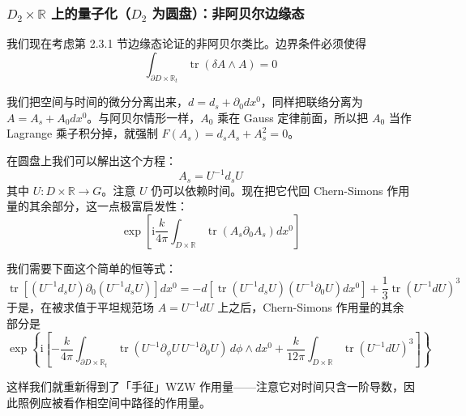 \subsubsection{\texorpdfstring{$D_2\times\mathbb{R}$}{D2xR} 上的量子化（$D_2$ 为圆盘）：非阿贝尔边缘态} %

我们现在考虑第 2.3.1 节边缘态论证的非阿贝尔类比。边界条件必须使得
\begin{equation}
  \int_{\partial D\times\mathbb{R}_t}\operatorname{tr}(\delta A\wedge A)=0
  \tag{3.82}
  \label{eq:3.82}
\end{equation}

我们把空间与时间的微分分离出来，$d=d_s+\partial_0dx^0$，同样把联络分离为 $A=A_s+A_0dx^0$。与阿贝尔情形一样，$A_0$ 乘在 Gauss 定律前面，所以把 $A_0$ 当作 Lagrange 乘子积分掉，就强制 $F(A_s)=d_sA_s+A_s^2=0$。

在圆盘上我们可以解出这个方程：
\begin{equation}
  A_s=U^{-1}d_sU
  \tag{3.83}
  \label{eq:3.83}
\end{equation}
其中 $U:D\times\mathbb{R}\to G$。注意 $U$ 仍可以依赖时间。现在把它代回 Chern-Simons 作用量的其余部分，这一点极富启发性：
\begin{equation}
  \exp\left[\mathrm{i}\frac{k}{4\pi}\int_{D\times\mathbb{R}}\operatorname{tr}(A_s\partial_0A_s)dx^0\right]
  \tag{3.84}
  \label{eq:3.84}
\end{equation}

我们需要下面这个简单的恒等式：
\begin{equation}
  \operatorname{tr}\left[(U^{-1}d_sU)\partial_0(U^{-1}d_sU)\right]dx^0
  =-d\left[\operatorname{tr}(U^{-1}d_sU)(U^{-1}\partial_0U)dx^0\right]+\frac{1}{3}\operatorname{tr}(U^{-1}dU)^3
  \tag{3.85}
  \label{eq:3.85}
\end{equation}
于是，在被求值于平坦规范场 $A=U^{-1}dU$ 上之后，Chern-Simons 作用量的其余部分是
\begin{equation}
  \exp\left\{\mathrm{i}\left[-\frac{k}{4\pi}\int_{\partial D\times\mathbb{R}_t}\operatorname{tr}(U^{-1}\partial_\phi U\,U^{-1}\partial_0U)\,d\phi\wedge dx^0
  +\frac{k}{12\pi}\int_{D\times\mathbb{R}}\operatorname{tr}(U^{-1}dU)^3\right]\right\}
  \tag{3.86}
  \label{eq:3.86}
\end{equation}

这样我们就重新得到了「手征」WZW 作用量——注意它对时间只含一阶导数，因此照例应被看作相空间中路径的作用量。


